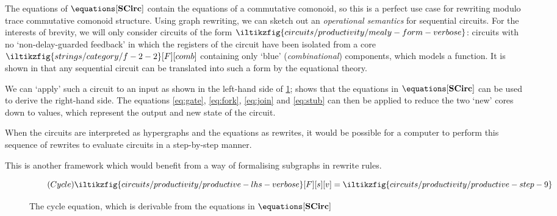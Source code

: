 The equations of \(\equations[\mathbf{SCirc}]\) contain the equations of a
commutative comonoid, so this is a perfect use case for rewriting modulo
trace commutative comonoid structure.
Using graph rewriting, we can sketch out an \emph{operational semantics} for
sequential circuits.
For the interests of brevity, we will only consider circuits of the form \(
    \iltikzfig{circuits/productivity/mealy-form-verbose}
\): circuits with no `non-delay-guarded feedback' in which the registers of the
circuit have been isolated from a core \(
    \iltikzfig{strings/category/f-2-2}[F][comb]
\) containing only `blue' (\emph{combinational}) components, which models a
function.
It is shown in \cite[Sec. VI]{ghica2022compositional} that any sequential
circuit can be translated into such a form by the equational theory.

We can `apply' such a circuit to an input as shown in the left-hand side of
\cref{fig:cycle}; \cite[Thm. 104]{ghica2022compositional} shows that the
equations in \(\equations[\mathbf{SCirc}]\) can be used to derive the right-hand
side.
The equations \eqref{eq:gate}, \eqref{eq:fork}, \eqref{eq:join} and
\eqref{eq:stub} can then be applied to reduce the two `new' cores down to
values, which represent the output and new state of the circuit.

When the circuits are interpreted as hypergraphs and the equations as rewrites,
it would be possible for a computer to perform this sequence of rewrites to
evaluate circuits in a step-by-step manner.

\begin{remark}
    This is another framework which would benefit from a way of formalising
    subgraphs in rewrite rules.
\end{remark}

\begin{figure*}
    \centering
    \begin{equation*}
        \tag{\(\mathsf{Cycle}\)}
        \iltikzfig{circuits/productivity/productive-lhs-verbose}[F][s][v]
        =
        \iltikzfig{circuits/productivity/productive-step-9}
        \label{eq:cycle}
    \end{equation*}
    \caption{
        The cycle equation, which is derivable from the equations in
        \(\equations[\mathbf{SCirc}]\)
    }
    \label{fig:cycle}
\end{figure*}
